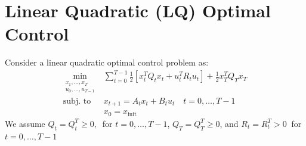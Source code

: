 \documentclass[openany]{book}
\theoremstyle{definition}
\theoremstyle{remark}
\begin{document}

\chapter{Linear Quadratic (LQ) Optimal Control}

Consider a linear quadratic optimal control problem as: 
\begin{align*}
        \min_{\substack{x_1,\dots,x_T \\ u_0,\dots,u_{T-1}}} & \displaystyle\sum_{t=0}^{T-1}\displaystyle\frac{1}{2}[x_t^TQ_tx_t+u_t^TR_tu_t] + \displaystyle\frac{1}{2}x_T^TQ_Tx_T\\
        \text{subj. to } & x_{t+1} = A_tx_t + B_tu_t \quad t=0,\dots,T-1\\
                        &x_0 = x_{\text{init}}
\end{align*}
We assume $Q_t=Q_t^T\geq 0,\ $ for $ t=0,\dots,T-1$, $Q_T = Q_T^T \geq 0$, and $R_t=R_t^T > 0 \ $ for $t=0,\dots,T-1$
\end{document}
